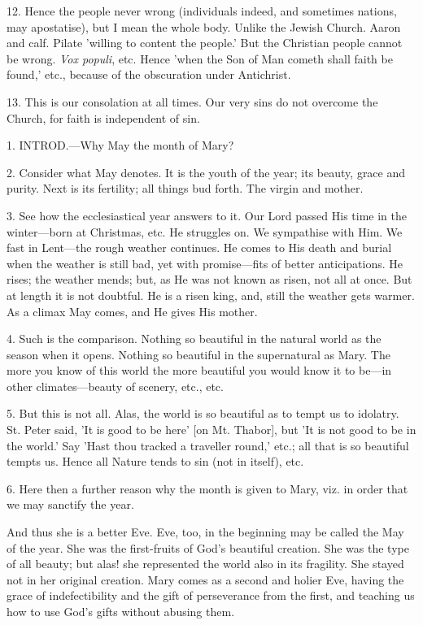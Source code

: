 12. Hence the people never wrong (individuals
indeed, and sometimes nations, may apostatise), but I mean the whole
body. Unlike the Jewish Church. Aaron and calf. Pilate 'willing to
content the people.' But the Christian people cannot be wrong. \emph{Vox
populi}, etc. Hence 'when the Son of Man cometh shall faith be
found,' etc., because of the obscuration under Antichrist.

13. This is our consolation at all times. Our
very sins do not overcome the Church, for faith is independent of sin.


1. INTROD.—Why
May the month of Mary?

2. Consider what May denotes. It is the youth of
the year; its beauty, grace and purity. Next is its fertility; all
things bud forth. The virgin and mother.

3. See how the ecclesiastical year answers to it.
Our Lord passed His time in the winter—born at Christmas, etc. He
struggles on. We sympathise with Him. We fast in Lent—the rough
weather continues. He comes to His death and burial when the weather
is still bad, yet with promise—fits of better anticipations. He
rises; the weather mends; but, as He was not known as risen, not all
at once. But at length it is not doubtful. He is a risen king, and,
still the weather gets warmer. As a climax May comes, and He gives His
mother.

4. Such is the comparison. Nothing so beautiful
in the natural world as the season when it opens. Nothing so beautiful
in the supernatural as Mary. The more you know of this world the more
beautiful you would know it to be—in other climates—beauty of
scenery, etc., etc.

5. But this is not all. Alas, the world is so
beautiful as to tempt us to idolatry. St. Peter said, 'It is good to
be here' [on Mt. Thabor], but 'It is not good to be in the world.' Say
'Hast thou tracked a traveller round,' etc.; all that is so beautiful
tempts us. Hence all Nature tends to sin (not in itself), etc.

6. Here then a further reason why the month is
given to Mary, viz. in order that we may sanctify the year.

And thus she is a better Eve. Eve, too, in the
beginning may be called the May of the year. She was the first-fruits
of God's beautiful creation. She was the type of all beauty; but alas!
she represented the world also in its fragility. She stayed not in her
original creation. Mary comes as a second and holier Eve, having the
grace of indefectibility and the gift of perseverance from the first,
and teaching us how to use God's gifts without abusing them.

